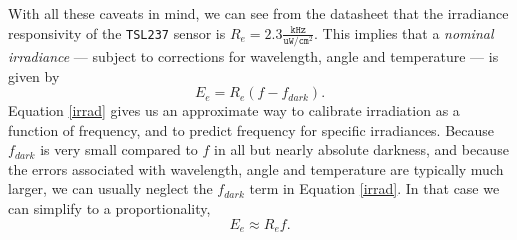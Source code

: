 With all these caveats in mind, we can see from the datasheet that the irradiance responsivity of the \texttt{TSL237} sensor is $R_e=2.3 \frac{\mathtt{kHz}}{\mathtt{uW}/\mathtt{cm}^2}$.
This implies that a \emph{nominal irradiance} --- subject to corrections for wavelength, angle and temperature --- is given by
\begin{equation}\label{irrad}
E_e = R_e (f-f_{dark}) .
\end{equation}
Equation \ref{irrad} gives us an approximate way to calibrate irradiation as a function of frequency, and to predict frequency for specific irradiances.
Because $f_{dark}$ is very small compared to $f$ in all but nearly absolute darkness, and because the errors associated with wavelength, angle and temperature are typically much larger, we can usually neglect the $f_{dark}$ term in Equation \ref{irrad}.
In that case we can simplify to a proportionality,
\begin{equation}\label{irrad2}
E_e \approx R_e f .
\end{equation}

 
